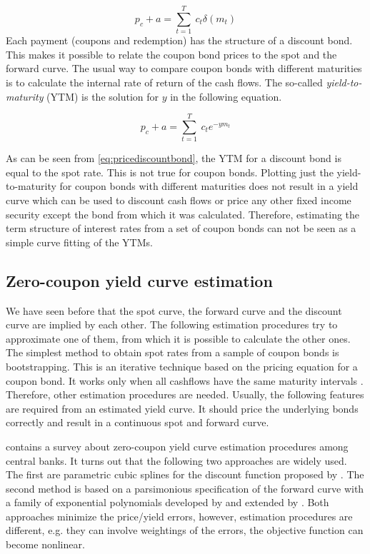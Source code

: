 \begin{equation}
  \label{bondprceq2}
  p_c+a=\sum_{t=1}^T \ c_t \delta(m_t) 
\end{equation}
Each payment (coupons and redemption) has the structure of a discount bond. This makes it possible to relate the coupon bond prices to the spot and the forward curve. The usual way to compare coupon bonds with different maturities is to calculate the internal rate of return of the cash flows. The so-called \emph{yield-to-maturity} (YTM) is the solution for $y$ in the following equation.

\begin{equation}
   \label{yield}
   p_c+a=\sum_{t=1}^T \ c_t e^{-ym_t}
 \end{equation}

As can be seen from \eqref{eq:pricediscountbond}, the YTM for a discount bond is equal to the spot rate. This is not true for coupon bonds. Plotting just the yield-to-maturity for coupon bonds with different maturities does not result in a yield curve which can be used to discount cash flows or price any other fixed income security except the bond from which it was calculated. Therefore, estimating the term structure of interest rates from a set of coupon bonds can not be seen as a simple curve fitting of the YTMs.

\subsection{Zero-coupon yield curve estimation}

We have seen before that the spot curve, the forward curve and the discount curve are implied by each other. The following estimation procedures try to approximate one of them, from which it is possible to calculate the other ones. The simplest method to obtain spot rates from a sample of coupon bonds is bootstrapping. This is an iterative technique based on the pricing equation for a coupon bond. It works only when all cashflows have the same maturity intervals \citep[see, e.g.][]{Hagan2006}. Therefore, other estimation procedures are needed. Usually, the following features are required from an estimated yield curve. It should price the underlying bonds correctly and result in a continuous spot and forward curve. 

\cite{BIS2005} contains a survey about zero-coupon yield curve estimation procedures among central banks. It turns out that the following two approaches are widely used. The first are parametric cubic splines for the discount function proposed by \cite{McCulloch1971, McCulloch1975}. The second method is based on a parsimonious specification of the forward curve with a family of exponential polynomials developed by \cite{Nelson1987} and extended by \cite{Svensson1994}. Both approaches minimize the price/yield errors, however, estimation procedures are different, e.g. they can involve weightings of the errors, the objective function can become nonlinear.

